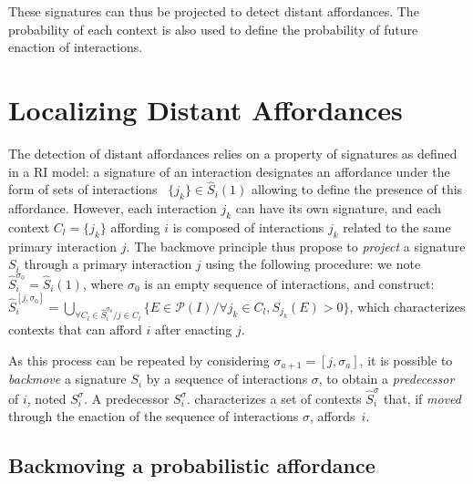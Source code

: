 \documentclass[conference]{IEEEtran}
\begin{document}
These signatures can thus be projected to detect distant affordances. The probability of each context is also used to define the probability of future enaction of interactions.



\section{Localizing Distant Affordances}

The detection of distant affordances relies on a property of signatures as defined in a RI model: a signature of an interaction designates an affordance under the form of sets of interactions ~$\{j_k\} \in \hat{S}_i(1)$ allowing to define the presence of this affordance.
However, each interaction $j_k$ can have its own signature, and each context $C_l=\{j_k\}$ affording $i$ is composed of interactions $j_k$ related to the same primary interaction $j$. The backmove principle thus propose to \textit{project} a signature $S_i$ through a primary interaction $j$ using the following procedure: we note $\hat{S}_i^{\sigma_0} = \hat{S}_i(1)$, where $\sigma_0$ is an empty sequence of interactions, and construct:
$\hat{S}_i^{[j,\sigma_0]}\!=\!\bigcup_{\forall C_l \in \hat{S}_i^{\sigma_0} / j \in C_l} \{E \in \mathcal{P}(I) / \forall j_k \in C_l, S_{j_k}(E)\!>\!0\}$, which characterizes contexts that can afford $i$ after enacting $j$.

As this process can be repeated by considering $\sigma_{a+1}=[j,\sigma_a]$, it is possible to \textit{backmove} a signature $S_i$ by a sequence of interactions $\sigma$, to obtain a \textit{predecessor} of $i$, noted $S_i^\sigma$. A predecessor $S_i^\sigma$. characterizes a set of contexts $\hat{S}_i^\sigma$ that, if \textit{moved} through the enaction of the sequence of interactions $\sigma$, affords~$i$.



\subsection{Backmoving a probabilistic affordance}
\end{document}
